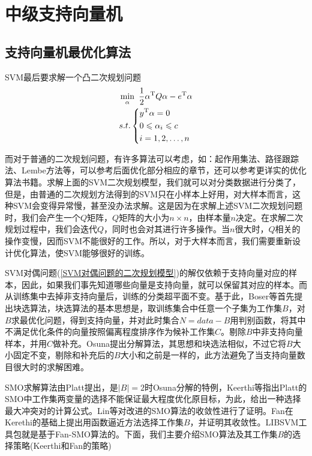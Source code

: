 
\chapter{中级支持向量机}
\section{支持向量机最优化算法}
    \par
    SVM最后要求解一个凸二次规划问题
    \begin{align}
    \label{SVM对偶问题的二次规划模型}
    & \min _\alpha \ \frac{1}{2}\alpha^\mathrm{T}Q\alpha - e^\mathrm{T}\alpha\\
    & s.t.\left\{
    \begin{aligned}
    & y^\mathrm{T} \alpha  = 0\\
    & 0 \leqslant \alpha_i \leqslant c\\
    & i=1,2,\dots,n
    \end{aligned}
    \right.\notag
    \end{align}
    \par
    而对于普通的二次规划问题，有许多算法可以考虑，如：起作用集法、路径跟踪法、Lembe方法等，可以参考后面优化部分相应的章节，还可以参考更详实的优化算法书籍。求解上面的SVM二次规划模型，我们就可以对分类数据进行分类了，但是，由普通的二次规划方法得到的SVM只在小样本上好用，对大样本而言，这种SVM会变得异常慢，甚至没办法求解。这是因为在求解上述SVM二次规划问题时，我们会产生一个$Q$矩阵，$Q$矩阵的大小为$n\times n$，由样本量$n$决定。在求解二次规划过程中，我们会迭代$Q$，同时也会对其进行许多操作。当$n$很大时，$Q$相关的操作变慢，因而SVM不能很好的工作。所以，对于大样本而言，我们需要重新设计优化算法，使SVM能够很好的训练。
    \par
    SVM对偶问题(\ref{SVM对偶问题的二次规划模型})的解仅依赖于支持向量对应的样本，因此，如果我们事先知道哪些向量是支持向量，就可以保留其对应的样本。而从训练集中去掉非支持向量后，训练的分类超平面不变。基于此，Boser等首先提出块选算法，块选算法的基本思想是，取训练集合中任意一个子集为工作集$B$，对$B$求最优化问题，得到支持向量，并对此时集合$N = data - B$用判别函数，将其中不满足优化条件的向量按照偏离程度排序作为候补工作集$C$。剔除$B$中非支持向量样本，并用$C$做补充。Osuna提出分解算法，其思想和块选法相似，不过它将$B$大小固定不变，剔除和补充后的$B$大小和之前是一样的，此方法避免了当支持向量数目很大时的求解困难。
    \par
    SMO求解算法由Platt提出，是$|B| = 2$时Osuna分解的特例，Keerthi等指出Platt的SMO中工作集两变量的选择不能保证最大程度优化原目标，为此，给出一种选择最大冲突对的计算公式。Lin等对改进的SMO算法的收敛性进行了证明。Fan在Kerethi的基础上提出用函数逼近方法选择工作集$B$，并证明其收敛性。LIBSVM工具包就是基于Fan-SMO算法的。下面，我们主要介绍SMO算法及其工作集$B$的选择策略(Keerthi和Fan的策略)
